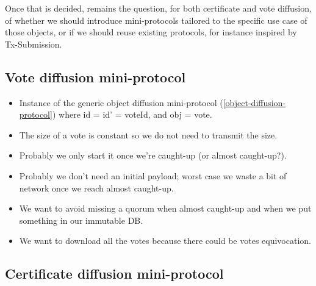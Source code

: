 Once that is decided, remains the question, for both certificate and vote
diffusion, of whether we should introduce mini-protocols tailored to the
specific use case of those objects, or if we should reuse existing protocols,
for instance inspired by Tx-Submission.


\subsection{Vote diffusion mini-protocol}%
\label{sec:vote-diffusion}

\begin{itemize}
\item Instance of the generic object diffusion mini-protocol
  (\autoref{object-diffusion-protocol}) where id = id’ = voteId, and obj = vote.

\item The size of a vote is constant so we do not need to transmit the size.

\item Probably we only start it once we’re caught-up (or almost caught-up?).

\item Probably we don’t need an initial payload; worst case we waste a bit of
  network once we reach almost caught-up.

\item We want to avoid missing a quorum when almost caught-up and when we put
  something in our immutable DB.

\item We want to download all the votes because there could be votes
  equivocation.
\end{itemize}

\subsection{Certificate diffusion mini-protocol}%
\label{sec:certificate-diffusion}

